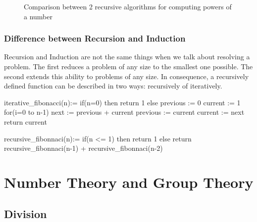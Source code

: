 \documentclass{article}
\begin{document}
\begin{figure}%
    \centering
    \qquad
    \caption{Comparison between 2 recursive algorithms for computing powers of a number}%
    \label{fig:powers}%
\end{figure}

\subsubsection{Difference between Recursion and Induction} Recursion and Induction are not the same things when we talk about resolving a problem. The first reduces a problem of any size to the smallest one possible. The second extends this ability to problems of any size. In consequence, a recursively defined function can be described in two ways: recursively of iteratively.

\begin{mylisting}
	iterative_fibonacci(n):=
		if(n=0) then return 1
		else
			previous := 0
			current := 1
			for(i=0 to n-1)
				next := previous + current
				previous := current
				current := next
			return current				
\end{mylisting}
\begin{mylisting}
	recursive_fibonnaci(n):=
		if(n <= 1) then return 1
		else return recursive_fibonnaci(n-1) +
		 recursive_fibonnaci(n-2)			
\end{mylisting}

\section{Number Theory and Group Theory}
\subsection{Division}
\end{document}
